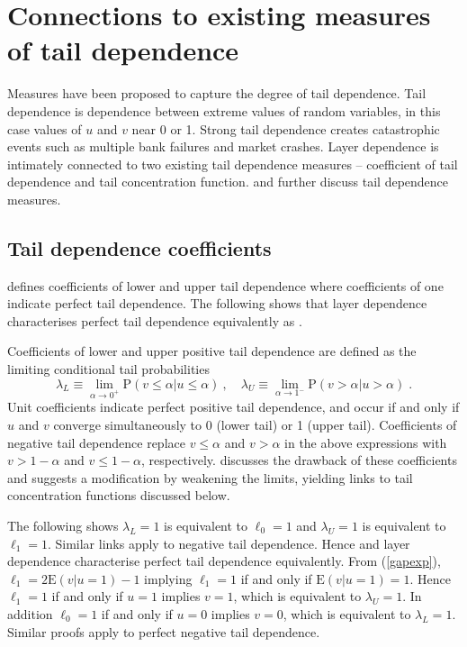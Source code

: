 \documentclass[authoryear]{elsarticle}
\newcommand{\E}{{\mathrm E}}
\newcommand{\p}{\mathrm{P}}
\newcommand{\cq}{\ ,\quad }
\newcommand{\eref}[1]{(\ref{#1})}
\begin{document}
\section{Connections to existing measures of tail dependence}\label{sliterature}

Measures have been proposed to capture the degree of tail dependence. Tail dependence is dependence between extreme values of random variables, in this case values of $u$ and $v$ near 0 or 1. Strong tail dependence creates catastrophic events such as  multiple bank failures and  market crashes. Layer dependence is intimately connected to two existing tail dependence measures -- coefficient of tail dependence and tail concentration function. \cite{sweeting2013calculating} and \cite{durante2014copulas} further discuss tail dependence measures.


\subsection{Tail dependence coefficients}

\cite{joe1997multivariate} defines coefficients of lower and upper tail dependence where coefficients of one indicate perfect tail dependence. The following shows that layer dependence characterises perfect tail dependence equivalently as \cite{joe1997multivariate}.

Coefficients of lower and upper positive tail dependence are defined as the limiting conditional tail probabilities
$$
\lambda_L \equiv \lim_{\alpha\rightarrow 0^+} \p(v\leq \alpha |u\leq \alpha) \cq
\lambda_U \equiv \lim_{\alpha\rightarrow 1^-} \p(v>\alpha |u>\alpha) \;.
$$
Unit coefficients indicate perfect positive tail dependence, and occur if and only if $u$ and $v$ converge simultaneously to 0 (lower tail) or 1 (upper tail). Coefficients of negative tail dependence replace $v\leq \alpha$ and $v>\alpha$ in the above expressions with $v>1-\alpha$ and $v\leq 1-\alpha$, respectively.  \cite{sweeting2013calculating} discusses the drawback of these coefficients and suggests a modification by weakening the limits, yielding links to tail concentration functions discussed below.

The following shows $\lambda_L=1$ is equivalent to $\ell_0=1$ and $\lambda_U=1$ is equivalent to $\ell_1=1$. Similar links apply to negative tail dependence. Hence \cite{joe1997multivariate} and layer dependence characterise perfect tail dependence equivalently. From \eref{gapexp}, $\ell_1=2\E(v|u=1)-1$ implying $\ell_1=1$ if and only if $\E(v|u=1)=1$. Hence $\ell_1=1$ if and only if $u=1$ implies $v=1$, which is equivalent to $\lambda_U=1$. In addition $\ell_0=1$ if and only if $u=0$ implies $v=0$, which is equivalent to $\lambda_L=1$. Similar proofs apply to perfect negative tail dependence.
\end{document}
